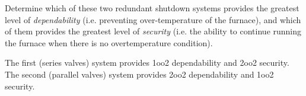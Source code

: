 Determine which of these two redundant shutdown systems provides the greatest level of {\it dependability} (i.e. preventing over-temperature of the furnace), and which of them provides the greatest level of {\it security} (i.e. the ability to continue running the furnace when there is no overtemperature condition).







The first (series valves) system provides 1oo2 dependability and 2oo2 security.  The second (parallel valves) system provides 2oo2 dependability and 1oo2 security.











